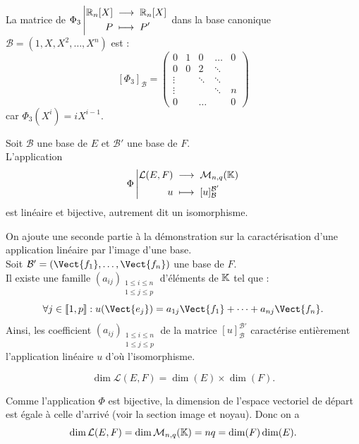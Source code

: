 \documentclass{book}
\begin{document}
\begin{Exemple} La matrice de ${\Phi _3}\left|\begin{aligned}{\mathbb {R}_n[X] }&\;\longrightarrow\;{\mathbb {R}_n[X]}\\{P}&\;\longmapsto\;{P'}\end{aligned}\right.$ dans la base canonique $\mathcal{B}=(1,X,X^2,\dots,X^n)$ est :
 $$[\Phi _3]_{\mathcal{B}}= \begin{pmatrix} 0 &1&0&\ldots &0 \\
 0& 0&2&\ddots \\
 \vdots &  &\ddots & \ddots \\
  \vdots &  & & \ddots& n\\
 0 &  & \dots& & 0
\end{pmatrix}   $$
car $\Phi _3(X^i)=i X^{i-1}$.
\end{Exemple}
\begin{Theoreme}[Dualité]
Soit $\mathcal{B}$ une base de $E$ et $\mathcal{B}'$ une base de $F$.\\
L'application
\[ {\Phi}\left|\begin{aligned}{\mathcal{L}(E,F)}&\;\longrightarrow\;{\mathcal{M}_{n,q}(\mathbb{K}) }\\{u}&\;\longmapsto\;{[u]_\mathcal{B}^{\mathcal{B}'}}\end{aligned}\right. \]
est linéaire et bijective, autrement dit un isomorphisme.
\end{Theoreme}
\begin{Demonstration}
On ajoute une seconde partie à la démonstration sur la caractérisation d'une application linéaire par l'image d'une base.\\
Soit $\mathcal{B}'=(\Vect{f_1},\dots,\Vect{f_n})$ une base de $F$.\\
Il existe une famille $(a_{ij})_{\substack{1\leq i\leq n\\1\leq j\leq p}}$ d'éléments de $\mathbb{K}$ tel que :
$$\forall j\in \Intf{1}{p}: u(\Vect{e_j})=a_{1j}\Vect{f_1}+\dots+a_{nj}\Vect{f_n}.$$ 
Ainsi, les coefficient $(a_{ij})_{\substack{1\leq i\leq n\\1\leq j\leq p}}$ de la matrice $[u]_\mathcal{B}^{\mathcal{B}'}$   caractérise entièrement l'application linéaire $u$ d'où l'isomorphisme. 
\end{Demonstration}

\begin{Corollaire}
$$\dim \mathcal{L}(E,F) = \dim(E) \times\dim(F).$$
\end{Corollaire}
\begin{Demonstration}
Comme l'application $\Phi$ est bijective, la dimension de l'espace vectoriel de départ est égale à celle d'arrivé (voir la section image et noyau). Donc on a $$\dim \mathcal{L}(E,F)=\dim \mathcal{M}_{n,q}(\mathbb{K})= n q= \dim (F)\dim (E).$$ 
\end{Demonstration}
\end{document}
